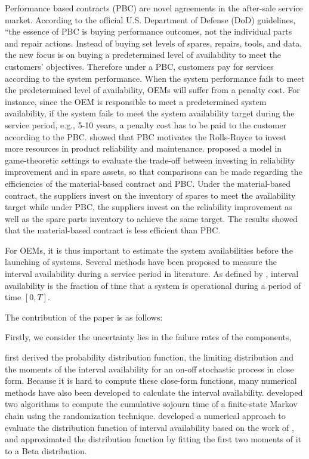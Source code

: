 \documentclass[preprint,12pt]{elsarticle}
\begin{document}
Performance based contracts (PBC) are novel agreements in the after-sale service market. According to the official U.S. Department of Defense (DoD) guidelines, “the essence of PBC is buying performance outcomes, not the individual parts and repair actions. Instead of buying set levels of spares, repairs, tools, and data, the new focus is on buying a predetermined level of availability to meet the customers' objectives. Therefore under a PBC, customers pay for services according to the system performance. When the system performance fails to meet the predetermined level of availability, OEMs will suffer from a penalty cost.  For instance, since the OEM is responsible to meet a predetermined system availability, if the system fails to meet the system availability target during the service period, e.g., 5-10 years, a penalty cost has to be paid to the customer according to the PBC. \citet{Guajardo} showed that PBC motivates the Rolls-Royce to invest more resources in product reliability and maintenance. \citet{Kim2011} proposed a model in game-theoretic settings to evaluate the trade-off between investing in reliability improvement and in spare assets, so that comparisons can be made regarding the efficiencies of the material-based contract and PBC.  Under the material-based contract, the suppliers invest on the inventory of spares to meet the availability target while under PBC, the suppliers invest on the reliability improvement as well as the spare parts inventory to achieve the same target. The results showed that the material-based contract is less efficient than PBC.

For OEMs,  it is thus important to estimate the system availabilities before the launching of systems. Several methods have been proposed to measure the interval availability during a service period in literature. As defined by \citet{Nakagawa}, interval availability is the fraction of time that a system is operational during a period of time $[0,T]$.

The contribution of the paper is as follows:

Firstly, we consider the uncertainty lies in the failure rates of the components,

\citet{Takacs} first derived the probability distribution function, the limiting distribution and the moments of the interval availability for an on-off stochastic process in close form. Because  it is hard to compute these close-form functions, many numerical methods have  also been developed to calculate the interval availability. \citet{DeSouza} developed two algorithms to compute the cumulative sojourn time of a finite-state Markov chain using the randomization technique. \citet{AlHanbali} developed a numerical approach to evaluate the distribution function of interval availability based on the work of \citet{DeSouza}, and approximated the distribution function by fitting the first two moments of it to a Beta distribution.
\end{document}
